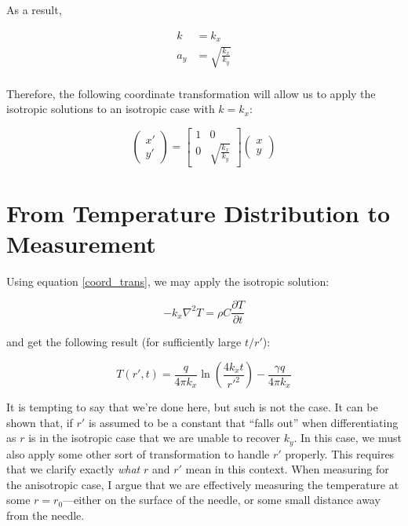 As a result,

\begin{align*}
k &= k_x\\ a_y &= \sqrt{\frac{k_x}{k_y}}\\
\end{align*}

Therefore, the following coordinate transformation will allow us to apply the
isotropic solutions to an isotropic case with \(k = k_x\):

\begin{equation}
    \label{coord_trans}
    \begin{pmatrix}x' \\ y'\end{pmatrix} =
    \begin{bmatrix}1 & 0\\ 0 & \sqrt{\frac{k_x}{k_y}} \end{bmatrix}\begin{pmatrix}x \\ y\end{pmatrix}
\end{equation}

\section{From Temperature Distribution to Measurement}
\label{sec:analytical-np:isotropic}

Using equation \ref{coord_trans}, we may apply the isotropic solution:

\begin{equation}
    -k_x \nabla^2 T = \rho C\frac{\partial T}{\partial t}
\end{equation}

and get the following result (for sufficiently large \(t/r'\)):

\begin{equation}
T(r',t) = \frac{q}{4\pi k_x}\ln\left(\frac{4k_xt}{r'^2}\right) - \frac{\gamma q}{4\pi k_x}
\end{equation}

It is tempting to say that we're done here, but such is not the case. It can be
shown that, if \(r'\) is assumed to be a constant that ``falls out'' when 
differentiating as \(r\) is in the isotropic case that we are unable to recover
\(k_y\). In this case, we must also apply some other sort of transformation to
handle \(r'\) properly. This requires that we clarify exactly \emph{what} \(r\)
and \(r'\) mean in this context. When measuring for the anisotropic case, I
argue that we are effectively measuring the temperature at some
\(r = r_{\textrm{0}}\)---either on the surface of the needle, or some small
distance away from the needle.


